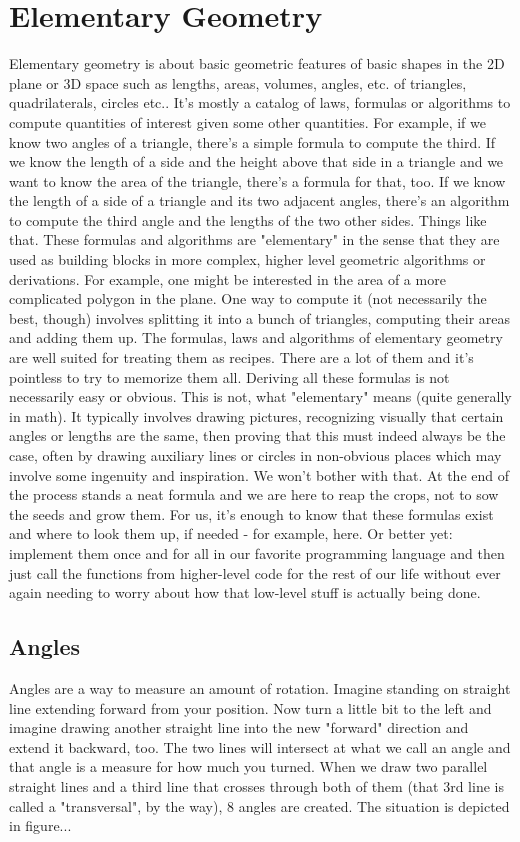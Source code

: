 \section{Elementary Geometry}
Elementary geometry is about basic geometric features of basic shapes in the 2D plane or 3D space such as lengths, areas, volumes, angles, etc. of triangles, quadrilaterals, circles etc.. It's mostly a catalog of laws, formulas or algorithms to compute quantities of interest given some other quantities. For example, if we know two angles of a triangle, there's a simple formula to compute the third. If we know the length of a side and the height above that side in a triangle and we want to know the area of the triangle, there's a formula for that, too. If we know the length of a side of a triangle and its two adjacent angles, there's an algorithm to compute the third angle and the lengths of the two other sides. Things like that. These formulas and algorithms are "elementary" in the sense that they are used as building blocks in more complex, higher level geometric algorithms or derivations. For example, one might be interested in the area of a more complicated polygon in the plane. One way to compute it (not necessarily the best, though) involves splitting it into a bunch of triangles, computing their areas and adding them up. The formulas, laws and algorithms of elementary geometry are well suited for treating them as recipes. There are a lot of them and it's pointless to try to memorize them all. Deriving all these formulas is not necessarily easy or obvious. This is not, what "elementary" means (quite generally in math). It typically involves drawing pictures, recognizing visually that certain angles or lengths are the same, then proving that this must indeed always be the case, often by drawing auxiliary lines or circles in non-obvious places which may involve some ingenuity and inspiration. We won't bother with that. At the end of the process stands a neat formula and we are here to reap the crops, not to sow the seeds and grow them. For us, it's enough to know that these formulas exist and where to look them up, if needed - for example, here. Or better yet: implement them once and for all in our favorite programming language and then just call the functions from higher-level code for the rest of our life without ever again needing to worry about how that low-level stuff is actually being done. 



\subsection{Angles}
Angles are a way to measure an amount of rotation. Imagine standing on straight line extending forward from your position. Now turn a little bit to the left and imagine drawing another straight line into the new "forward" direction and extend it backward, too. The two lines will intersect at what we call an angle and that angle is a measure for how much you turned. When we draw two parallel straight lines and a third line that crosses through both of them (that 3rd line is called a "transversal", by the way), 8 angles are created. The situation is depicted in figure...

